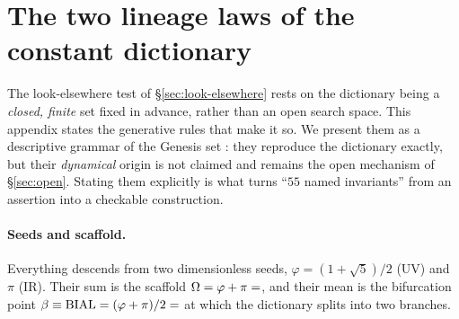 \documentclass[aps,prd,preprint,amsmath,amssymb,nofootinbib,longbibliography]{revtex4-2}
\begin{document}
\appendix
\section{The two lineage laws of the constant dictionary}
\label{app:laws}

The look-elsewhere test of \S\ref{sec:look-elsewhere} rests on the dictionary
being a \emph{closed, finite} set fixed in advance, rather than an open search
space. This appendix states the generative rules that make it so. We present
them as a descriptive grammar of the Genesis set
\citep{AlmeidaSSEE2026genesis}: they reproduce the dictionary exactly, but their
\emph{dynamical} origin is not claimed and remains the open mechanism of
\S\ref{sec:open}. Stating them explicitly is what turns ``$55$ named invariants''
from an assertion into a checkable construction.

\paragraph{Seeds and scaffold.} Everything descends from two dimensionless
seeds, $\varphi=(1+\sqrt5)/2$ (UV) and $\pi$ (IR). Their sum is the scaffold
$\Omega=\varphi+\pi=\val{OMEGA_d6}$, and their mean is the bifurcation point
$\beta\equiv\mathrm{BIAL}=(\varphi+\pi)/2=\val{BETA_d6}$ at which the dictionary splits
into two branches.
\end{document}
